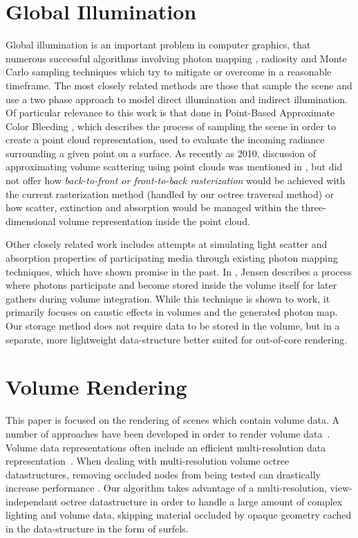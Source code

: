 \documentclass[12pt]{ucthesis}
\begin{document}
\section{Global Illumination}
Global illumination is an important problem in computer graphics, that numerous successful algorithms involving photon mapping \cite{Jensen:2009}, radiosity \cite{radiosity} and Monte Carlo sampling techniques \cite{monte_carlo} which try to mitigate or overcome in a reasonable timeframe.  The most closely related methods are those that sample the scene and use a two phase approach to model direct illumination and indirect illumination. Of particular relevance to this work is that done in Point-Based Approximate Color Bleeding \cite{christensen:2008}, which describes the process of sampling the scene in order to create a point cloud representation, used to evaluate the incoming radiance surrounding a given point on a surface.  As recently as 2010, discussion of approximating volume scattering using point clouds was mentioned in \cite{christensen:siggraph}, but did not offer how \textit{back-to-front or front-to-back rasterization} would be achieved with the current rasterization method (handled by our octree traversal method) or how scatter, extinction and absorption would be managed within the three-dimensional volume representation inside the point cloud.

Other closely related work includes attempts at simulating light scatter and absorption properties of participating media through existing photon mapping techniques, which have shown promise in the past.  In \cite{jensen:1998}, Jensen describes a process where photons participate and become stored inside the volume itself for later gathers during volume integration.  While this technique is shown to work, it primarily focuses on caustic effects in volumes and the generated photon map.  Our storage method does not require data to be stored in the volume, but in a separate, more lightweight data-structure better suited for out-of-core rendering.

\section{Volume Rendering}
This paper is focused on the rendering of scenes which contain volume data.  A number of approaches have been developed in order to render volume data~\cite{levoy88}\cite{Kajiya84}.  Volume data representations often include an efficient multi-resolution data representation~\cite{Westermann94}\cite{Levoy90}.  When dealing with multi-resolution volume octree datastructures, removing occluded nodes from being tested can drastically increase performance \cite{guthe}.  Our algorithm takes advantage of a multi-resolution, view-independant octree datastructure in order to handle a large amount of complex lighting and volume data, skipping material occluded by opaque geometry cached in the data-structure in the form of surfels.
\end{document}
